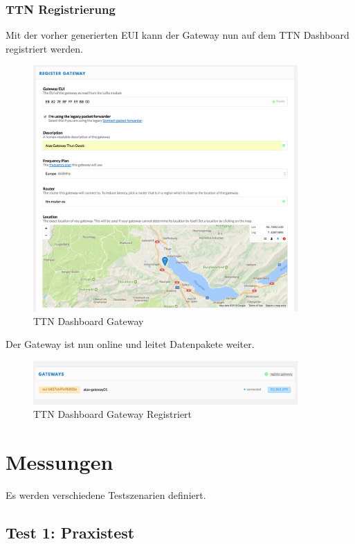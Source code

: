 \documentclass[11pt,english,german]{report}
\theoremstyle{definition}
\begin{document}
\subsubsection{TTN Registrierung}
Mit der vorher generierten EUI kann der Gateway nun auf dem TTN Dashboard registriert werden.
\begin{figure}[H]
	\centering
	\includegraphics[width=0.9\textwidth]{img/gateway/ttn_gateway.png}
	\caption[TTN Dashboard Gateway]
	{TTN Dashboard Gateway}
\end{figure}
\noindent
Der Gateway ist nun online und leitet Datenpakete weiter.
\begin{figure}[H]
	\centering
	\includegraphics[width=0.9\textwidth]{img/gateway/ttn_gateway_done.png}
	\caption[TTN Dashboard Gateway Registriert]
	{TTN Dashboard Gateway Registriert}
\end{figure}

\newpage
\section{Messungen}
Es werden verschiedene Testszenarien definiert.

\subsection{Test 1: Praxistest}
\end{document}
